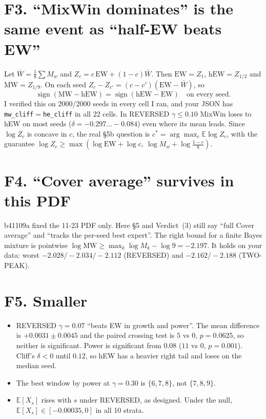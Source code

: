 \documentclass[11pt]{article}
\begin{document}
\section*{F3. ``MixWin dominates'' is the same event as ``half-EW beats EW''}
Let $\bar W=\frac18\sum M_w$ and $Z_c=c\,\text{EW}+(1-c)\bar W$. Then $\text{EW}=Z_1$, $\text{hEW}=Z_{1/2}$ and $\text{MW}=Z_{1/9}$. On each seed $Z_c-Z_{c'}=(c-c')(\text{EW}-\bar W)$, so
\[\operatorname{sign}(\text{MW}-\text{hEW})=\operatorname{sign}(\text{hEW}-\text{EW})\quad\text{on every seed}.\]
I verified this on 2000/2000 seeds in every cell I ran, and your JSON has \texttt{mw\_cliff}$=$\texttt{he\_cliff} in all 22 cells. In REVERSED $\gamma\le0.10$ MixWin loses to hEW on most seeds ($\delta=-0.297\dots-0.084$) even where its mean leads. Since $\log Z_c$ is concave in $c$, the real \S5b question is $c^\ast=\arg\max_c\mathbb E\log Z_c$, with the guarantee $\log Z_c\ge\max(\log\text{EW}+\log c,\ \log M_w+\log\frac{1-c}{8})$.

\section*{F4. ``Cover average'' survives in this PDF}
b41109a fixed the 11-23 PDF only. Here \S5 and Verdict~(3) still say ``full Cover average'' and ``tracks the per-seed best expert''. The right bound for a finite Bayes mixture is pointwise $\log\text{MW}\ge\max_k\log M_k-\log9=-2.197$. It holds on your data: worst $-2.028/-2.034/-2.112$ (REVERSED) and $-2.162/-2.188$ (TWO-PEAK).

\section*{F5. Smaller}
\begin{itemize}[nosep]
\item REVERSED $\gamma=0.07$ ``beats EW in growth and power''. The mean difference is $+0.0031\pm0.0045$ and the paired crossing test is $5$ vs $0$, $p=0.0625$, so neither is significant. Power is significant from $0.08$ ($11$ vs $0$, $p=0.001$). Cliff's $\delta<0$ until $0.12$, so hEW has a heavier right tail and loses on the median seed.
\item The best window by power at $\gamma=0.30$ is $\{6,7,8\}$, not $\{7,8,9\}$.
\item $\mathbb E[X_s]$ rises with $s$ under REVERSED, as designed. Under the null, $\mathbb E[X_s]\in[-0.00035,0]$ in all 10 strata.
\end{itemize}
\end{document}
